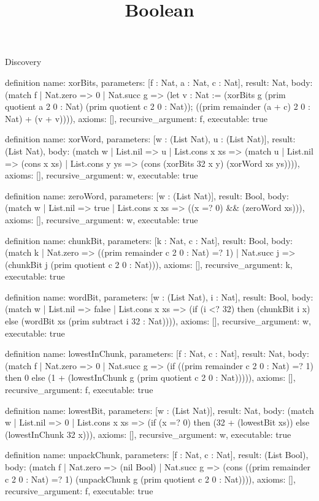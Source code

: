\begin{lexlean}{Discovery}
\title{Boolean}
\begin{semanticmodule}
definition{
  name: xorBits,
  parameters: [f : Nat, a : Nat, c : Nat],
  result: Nat,
  body: (match f
    | Nat.zero => 0
    | Nat.succ g => (let v : Nat := (xorBits g (prim quotient a 2 0 : Nat) (prim quotient c 2 0 : Nat)); ((prim remainder (a + c) 2 0 : Nat) + (v + v)))),
  axioms: [],
  recursive_argument: f,
  executable: true
}

definition{
  name: xorWord,
  parameters: [w : (List Nat), u : (List Nat)],
  result: (List Nat),
  body: (match w
    | List.nil => u
    | List.cons x xs => (match u
    | List.nil => (cons x xs)
    | List.cons y ys => (cons (xorBits 32 x y) (xorWord xs ys)))),
  axioms: [],
  recursive_argument: w,
  executable: true
}

definition{
  name: zeroWord,
  parameters: [w : (List Nat)],
  result: Bool,
  body: (match w
    | List.nil => true
    | List.cons x xs => ((x =? 0) && (zeroWord xs))),
  axioms: [],
  recursive_argument: w,
  executable: true
}

definition{
  name: chunkBit,
  parameters: [k : Nat, c : Nat],
  result: Bool,
  body: (match k
    | Nat.zero => ((prim remainder c 2 0 : Nat) =? 1)
    | Nat.succ j => (chunkBit j (prim quotient c 2 0 : Nat))),
  axioms: [],
  recursive_argument: k,
  executable: true
}

definition{
  name: wordBit,
  parameters: [w : (List Nat), i : Nat],
  result: Bool,
  body: (match w
    | List.nil => false
    | List.cons x xs => (if (i <? 32) then (chunkBit i x) else (wordBit xs (prim subtract i 32 : Nat)))),
  axioms: [],
  recursive_argument: w,
  executable: true
}

definition{
  name: lowestInChunk,
  parameters: [f : Nat, c : Nat],
  result: Nat,
  body: (match f
    | Nat.zero => 0
    | Nat.succ g => (if ((prim remainder c 2 0 : Nat) =? 1) then 0 else (1 + (lowestInChunk g (prim quotient c 2 0 : Nat))))),
  axioms: [],
  recursive_argument: f,
  executable: true
}

definition{
  name: lowestBit,
  parameters: [w : (List Nat)],
  result: Nat,
  body: (match w
    | List.nil => 0
    | List.cons x xs => (if (x =? 0) then (32 + (lowestBit xs)) else (lowestInChunk 32 x))),
  axioms: [],
  recursive_argument: w,
  executable: true
}

definition{
  name: unpackChunk,
  parameters: [f : Nat, c : Nat],
  result: (List Bool),
  body: (match f
    | Nat.zero => (nil Bool)
    | Nat.succ g => (cons ((prim remainder c 2 0 : Nat) =? 1) (unpackChunk g (prim quotient c 2 0 : Nat)))),
  axioms: [],
  recursive_argument: f,
  executable: true
}


\end{semanticmodule}
\end{lexlean}
